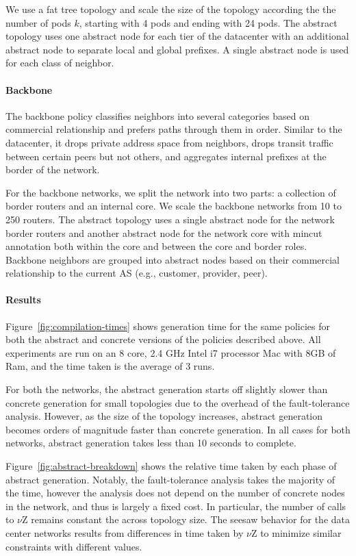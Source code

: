 \documentclass[numbers, 10pt, preprint]{sigplanconf}
\newcommand{\para}[1]{\paragraph*{\textbf{#1}}}
\begin{document}
We use a fat tree topology and scale the size of the topology according the the number of pods $k$, starting with 4 pods and ending with 24 pods. The abstract topology uses one abstract node for each tier of the datacenter with an additional abstract node to separate local and global prefixes. A single abstract node is used for each class of neighbor.



\para{Backbone}

The backbone policy classifies neighbors into several categories based on commercial relationship and prefers paths through them in order. Similar to the datacenter, it drops private address space from  neighbors, drops transit traffic between certain peers but not others, and aggregates internal prefixes at the border of the network.

For the backbone networks, we split the network into two parts: a collection of border routers and an internal core. We scale the backbone networks from 10 to 250 routers. The abstract topology uses a single abstract node for the network border routers and another abstract node for the network core with mincut annotation both within the core and between the core and border roles. Backbone neighbors are grouped into abstract nodes based on their commercial relationship to the current AS (e.g., customer, provider, peer).


\para{Results}

Figure~\ref{fig:compilation-times} shows generation time for the same policies for both the abstract and concrete versions of the policies described above. All experiments are run on an 8 core, 2.4 GHz Intel i7 processor Mac with 8GB of Ram, and the time taken is the average of 3 runs.

For both the networks, the abstract generation starts off slightly slower than concrete generation for small topologies due to the overhead of the fault-tolerance analysis. However, as the size of the topology increases, abstract generation becomes orders of magnitude faster than concrete generation. In all cases for both networks, abstract generation takes less than 10 seconds to complete.

Figure~\ref{fig:abstract-breakdown} shows the relative time taken by each phase of abstract generation. Notably, the fault-tolerance analysis takes the majority of the time, however the analysis does not depend on the number of concrete nodes in the network, and thus is largely a fixed cost. In particular, the number of calls to $\nu$Z remains constant the across topology size. The seesaw behavior for the data center networks results from differences in time taken by $\nu$Z to minimize similar constraints with different values.
\end{document}

